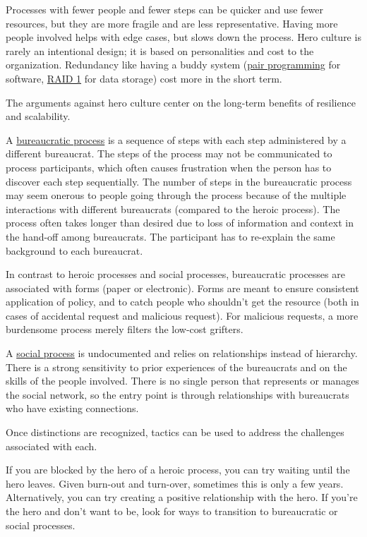 Processes with fewer people and fewer steps can be quicker and use fewer resources, but they are more fragile and are less representative. Having more people involved helps with edge cases, but slows down the process.  Hero culture is rarely an intentional design; it is based on personalities and cost to the organization. Redundancy like having a buddy system (\href{https://en.wikipedia.org/wiki/Pair_programming}{pair programming} for software, \href{https://en.wikipedia.org/wiki/Standard_RAID_levels#RAID_1}{RAID 1} for data storage) cost more in the short term. 

The arguments against hero culture center on the long-term benefits of resilience and scalability.  

A \underline{bureaucratic process} is a sequence of steps with each step administered by a different bureaucrat. The steps of the process may not be communicated to process participants, which often causes frustration when the person has to discover each step sequentially. The number of steps in the bureaucratic process may seem onerous to people going through the process because of the multiple interactions with different bureaucrats (compared to the heroic process). The process often takes longer than desired due to loss of information and context in the hand-off among bureaucrats. The participant has to re-explain the same background to each bureaucrat.

In contrast to heroic processes and social processes, bureaucratic processes are associated with forms (paper or electronic). 
Forms are meant to ensure consistent application of policy, and to catch people who shouldn't get the resource (both in cases of accidental request and malicious request). For malicious requests, a more burdensome process merely filters the low-cost grifters. 


A \underline{social process} is undocumented and relies on relationships instead of hierarchy. There is a strong sensitivity to prior experiences of the bureaucrats and on the skills of the people involved. There is no single person that represents or manages the social network, so the entry point is through relationships with bureaucrats who have existing connections.

Once distinctions are recognized, tactics can be used to address the challenges associated with each.

If you are blocked by the hero of a heroic process, you can try waiting until the hero leaves. Given burn-out and turn-over, sometimes this is only a few years. Alternatively, you can try creating a positive relationship with the hero.  If you're the hero and don't want to be, look for ways to transition to bureaucratic or social processes. 


